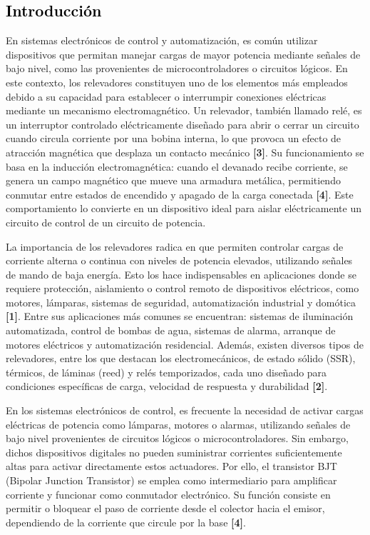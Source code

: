 \textcolor{black}{\section{Introducción}}
\noindent En sistemas electrónicos de control y automatización, es común utilizar dispositivos que permitan manejar cargas de mayor potencia mediante señales de bajo nivel, como las provenientes de microcontroladores o circuitos lógicos. En este contexto, los relevadores constituyen uno de los elementos más empleados debido a su capacidad para establecer o interrumpir conexiones eléctricas mediante un mecanismo electromagnético. Un relevador, también llamado relé, es un interruptor controlado eléctricamente diseñado para abrir o cerrar un circuito cuando circula corriente por una bobina interna, lo que provoca un efecto de atracción magnética que desplaza un contacto mecánico \textbf{[3]}. Su funcionamiento se basa en la inducción electromagnética: cuando el devanado recibe corriente, se genera un campo magnético que mueve una armadura metálica, permitiendo conmutar entre estados de encendido y apagado de la carga conectada \textbf{[4]}. Este comportamiento lo convierte en un dispositivo ideal para aislar eléctricamente un circuito de control de un circuito de potencia.

La importancia de los relevadores radica en que permiten controlar cargas de corriente alterna o continua con niveles de potencia elevados, utilizando señales de mando de baja energía. Esto los hace indispensables en aplicaciones donde se requiere protección, aislamiento o control remoto de dispositivos eléctricos, como motores, lámparas, sistemas de seguridad, automatización industrial y domótica \textbf{[1]}. Entre sus aplicaciones más comunes se encuentran: sistemas de iluminación automatizada, control de bombas de agua, sistemas de alarma, arranque de motores eléctricos y automatización residencial. Además, existen diversos tipos de relevadores, entre los que destacan los electromecánicos, de estado sólido (SSR), térmicos, de láminas (reed) y relés temporizados, cada uno diseñado para condiciones específicas de carga, velocidad de respuesta y durabilidad \textbf{[2]}.

En los sistemas electrónicos de control, es frecuente la necesidad de activar cargas eléctricas de potencia como lámparas, motores o alarmas, utilizando señales de bajo nivel provenientes de circuitos lógicos o microcontroladores. Sin embargo, dichos dispositivos digitales no pueden suministrar corrientes suficientemente altas para activar directamente estos actuadores. Por ello, el transistor BJT (Bipolar Junction Transistor) se emplea como intermediario para amplificar corriente y funcionar como conmutador electrónico. Su función consiste en permitir o bloquear el paso de corriente desde el colector hacia el emisor, dependiendo de la corriente que circule por la base \textbf{[4]}.

